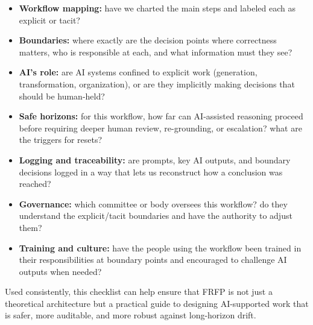 \begin{itemize}
  \item \textbf{Workflow mapping:}
    have we charted the main steps and labeled each as explicit or tacit?

  \item \textbf{Boundaries:}
    where exactly are the decision points where correctness matters,
    who is responsible at each, and what information must they see?

  \item \textbf{AI's role:}
    are AI systems confined to explicit work (generation, transformation, organization),
    or are they implicitly making decisions that should be human-held?

  \item \textbf{Safe horizons:}
    for this workflow, how far can AI-assisted reasoning proceed before requiring deeper human review, re-grounding, or escalation?
    what are the triggers for resets?

  \item \textbf{Logging and traceability:}
    are prompts, key AI outputs, and boundary decisions logged in a way that lets us reconstruct how a conclusion was reached?

  \item \textbf{Governance:}
    which committee or body oversees this workflow?
    do they understand the explicit/tacit boundaries and have the authority to adjust them?

  \item \textbf{Training and culture:}
    have the people using the workflow been trained in their responsibilities at boundary points and encouraged to challenge AI outputs when needed?
\end{itemize}

Used consistently, this checklist can help ensure that FRFP is not just a theoretical architecture but a practical guide to designing AI-supported work that is safer, more auditable, and more robust against long-horizon drift.
